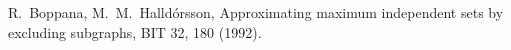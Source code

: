 R.~Boppana, M.~M.~Halld\'orsson,
\newblock Approximating maximum independent sets by excluding subgraphs,
\newblock BIT 32, 180 (1992).
